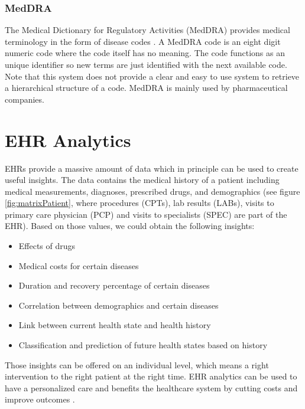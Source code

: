 \subsubsection{MedDRA}

The Medical Dictionary for Regulatory Activities (MedDRA) provides medical terminology in the form of disease codes \cite{MedDRA:online}. A MedDRA code is an eight digit numeric code where the code itself has no meaning. The code functions as an unique identifier so new terms are just identified with the next available code. Note that this system does not provide a clear and easy to use system to retrieve a hierarchical structure of a code. MedDRA is mainly used by pharmaceutical companies.

\section{EHR Analytics}
\label{sec:ehra}

EHRs provide a massive amount of data which in principle can be used to create useful insights. The data contains the medical history of a patient including medical measurements, diagnoses, prescribed drugs, and demographics (see figure \ref{fig:matrixPatient}, where procedures (CPTs), lab results (LABs), visits to primary care physician (PCP) and visits to specialists (SPEC) are part of the EHR). Based on those values, we could obtain the following insights:

\begin{itemize}

\item Effects of drugs
\item Medical costs for certain diseases
\item Duration and recovery percentage of certain diseases
\item Correlation between demographics and certain diseases
\item Link between current health state and health history
\item Classification and prediction of future health states based on history

\end{itemize}

Those insights can be offered on an individual level, which means a right intervention to the right patient at the right time. EHR analytics can be used to have a personalized care and benefits the healthcare system by cutting costs and improve outcomes \cite{rand1:article}. \\

